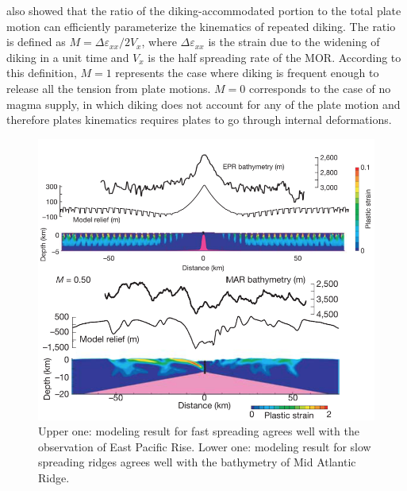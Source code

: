 \documentclass[12pt]{article}
\begin{document}
 also showed that the ratio of the diking-accommodated portion to the total plate motion can efficiently parameterize the kinematics of repeated diking. The ratio is defined as $M=\Delta\varepsilon_{xx}/2V_{x}$, where $\Delta\varepsilon_{xx}$ is the  strain due to the widening of diking in a unit time and $V_{x}$ is the half spreading rate of the MOR. According to this definition, $M=1$ represents the case where diking is frequent enough to release all the tension from plate motions. $M=0$ corresponds to the case of no magma supply, in which diking does not account for any of the plate motion and therefore plates kinematics requires plates to go through internal deformations.
\begin{figure}[H]
 \centering
  \includegraphics[scale=0.7]{fig5_1.png}
 \caption{\small{Upper one: modeling result for fast spreading agrees well with the observation of East Pacific Rise. Lower one: modeling result for slow spreading ridges agrees well with the bathymetry of Mid Atlantic Ridge. \citep{Buck2005}}}
 \label{fig5_1}
\end{figure}
\end{document}
